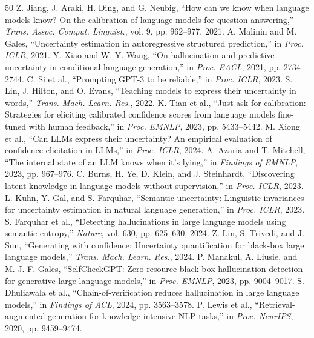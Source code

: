 \documentclass[10pt,conference]{IEEEtran}
\begin{document}
\begin{thebibliography}{50}
 Z. Jiang, J. Araki, H. Ding, and G. Neubig, ``How can we know when language models know? On the calibration of language models for question answering,'' \emph{Trans. Assoc. Comput. Linguist.}, vol. 9, pp. 962--977, 2021.
 A. Malinin and M. Gales, ``Uncertainty estimation in autoregressive structured prediction,'' in \emph{Proc. ICLR}, 2021.
 Y. Xiao and W. Y. Wang, ``On hallucination and predictive uncertainty in conditional language generation,'' in \emph{Proc. EACL}, 2021, pp. 2734--2744.
 C. Si et al., ``Prompting GPT-3 to be reliable,'' in \emph{Proc. ICLR}, 2023.
 S. Lin, J. Hilton, and O. Evans, ``Teaching models to express their uncertainty in words,'' \emph{Trans. Mach. Learn. Res.}, 2022.
 K. Tian et al., ``Just ask for calibration: Strategies for eliciting calibrated confidence scores from language models fine-tuned with human feedback,'' in \emph{Proc. EMNLP}, 2023, pp. 5433--5442.
 M. Xiong et al., ``Can LLMs express their uncertainty? An empirical evaluation of confidence elicitation in LLMs,'' in \emph{Proc. ICLR}, 2024.
 A. Azaria and T. Mitchell, ``The internal state of an LLM knows when it's lying,'' in \emph{Findings of EMNLP}, 2023, pp. 967--976.
 C. Burns, H. Ye, D. Klein, and J. Steinhardt, ``Discovering latent knowledge in language models without supervision,'' in \emph{Proc. ICLR}, 2023.
 L. Kuhn, Y. Gal, and S. Farquhar, ``Semantic uncertainty: Linguistic invariances for uncertainty estimation in natural language generation,'' in \emph{Proc. ICLR}, 2023.
 S. Farquhar et al., ``Detecting hallucinations in large language models using semantic entropy,'' \emph{Nature}, vol. 630, pp. 625--630, 2024.
 Z. Lin, S. Trivedi, and J. Sun, ``Generating with confidence: Uncertainty quantification for black-box large language models,'' \emph{Trans. Mach. Learn. Res.}, 2024.
 P. Manakul, A. Liusie, and M. J. F. Gales, ``SelfCheckGPT: Zero-resource black-box hallucination detection for generative large language models,'' in \emph{Proc. EMNLP}, 2023, pp. 9004--9017.
 S. Dhuliawala et al., ``Chain-of-verification reduces hallucination in large language models,'' in \emph{Findings of ACL}, 2024, pp. 3563--3578.
 P. Lewis et al., ``Retrieval-augmented generation for knowledge-intensive NLP tasks,'' in \emph{Proc. NeurIPS}, 2020, pp. 9459--9474.

\end{thebibliography}
\end{document}
